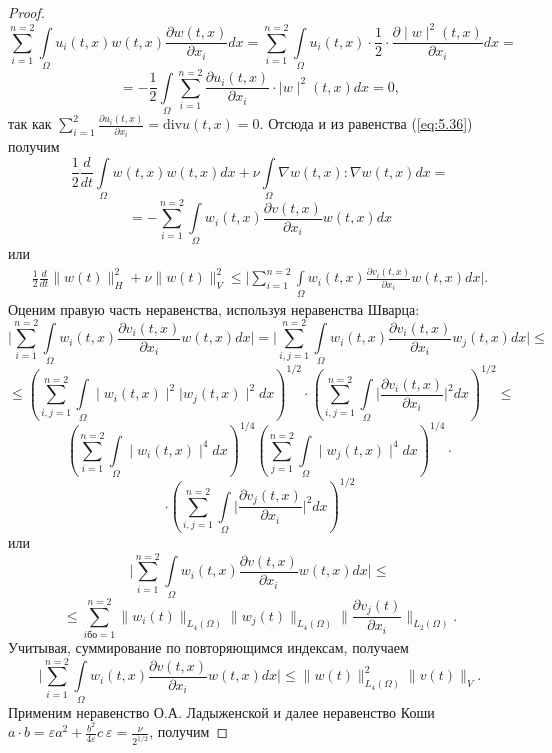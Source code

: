 \begin{proof}
    $$\sum_{i=1}^{n=2}\int\limits_\Omega u_i(t,x)w(t, x)\frac{\partial w(t, x)}{\partial x_i}dx=
    \sum_{i=1}^{n=2}\int\limits_\Omega u_i(t,x)\cdot\frac{1}{2}\cdot\frac{\partial \mid w\mid^2(t, x)}{\partial x_i}dx=$$
    $$=-\frac{1}{2}\int\limits_\Omega\sum_{i=1}^{n=2}\frac{\partial u_i(t, x)}{\partial x_i}\cdot\mid w\mid^2(t, x)dx=0,$$
    так как $\sum\limits_{i=1}^{2}\frac{\partial u_i(t, x)}{\partial x_i} = \textrm{div} u(t, x)=0.$
    Отсюда и из равенства (\ref{eq:5.36}) получим
    $$\frac{1}{2}\frac{d}{dt}\int\limits_\Omega w(t, x)w(t, x)dx+\nu\int\limits_{\Omega}\nabla w(t,x):\nabla w(t,x)dx=$$
    $$=-\sum_{i=1}^{n=2}\int\limits_\Omega w_i(t, x)\frac{\partial v(t, x)}{\partial x_i}w(t, x)dx$$
    или
    \begin{equation}\label{eq:5.37}
        \begin{gathered}
            \frac{1}{2}\frac{d}{dt}\| w(t)\|_H^2+\nu\| w(t)\|_V^2\le
            \bigg|\sum_{i=1}^{n=2}\int\limits_\Omega w_i(t, x)\frac{\partial v_i(t, x)}{\partial x_i}w(t, x)dx\bigg|.
        \end{gathered}
    \end{equation}
    Оценим правую часть неравенства, используя неравенства Шварца:
    $$\bigg|\sum_{i=1}^{n=2}\int\limits_\Omega w_i(t, x)\frac{\partial v_i(t, x)}{\partial x_i}w(t, x)dx\bigg|=
    \bigg|\sum_{i,j=1}^{n=2}\int\limits_\Omega w_i(t, x)\frac{\partial v_i(t, x)}{\partial x_i}w_j(t, x)dx\bigg|\le$$
    $$\le\left(\sum_{i,j=1}^{n=2}\int\limits_\Omega \mid w_i(t, x)\mid^2|w_j(t, x)\mid^2dx \right)^{1/2}
    \cdot\left(\sum_{i,j=1}^{n=2}\int\limits_\Omega\bigg|\frac{\partial v_i(t, x)}{\partial x_i}\bigg|^2dx \right)^{1/2}\le$$
    $$\left(\sum_{i=1}^{n=2}\int\limits_\Omega \mid w_i(t, x)\mid^4dx\right)^{1/4}\left(\sum_{j=1}^{n=2}\int\limits_\Omega \mid w_j(t, x)\mid^4dx\right)^{1/4}\cdot$$
    $$\cdot\left(\sum_{i,j=1}^{n=2}\int\limits_\Omega\bigg|\frac{\partial v_j(t, x)}{\partial x_i} \bigg|^2dx \right)^{1/2}$$
    или
    $$\bigg|\sum_{i=1}^{n=2}\int\limits_\Omega w_i(t, x)\frac{\partial v(t, x)}{\partial x_i}w(t, x)dx\bigg|\le$$
    $$\le\sum_{iбо=1}^{n=2}\| w_i(t)\|_{L_4(\Omega)}\| w_j(t)\|_{L_4(\Omega)}\|\frac{\partial v_j(t)}{\partial x_i}\|_{L_2(\Omega)}.$$
    Учитывая, суммирование по повторяющимся индексам, получаем
    $$\bigg|\sum_{i=1}^{n=2}\int\limits_\Omega w_i(t, x)\frac{\partial v(t, x)}{\partial x_i}w(t, x)dx\bigg|\le\| w(t)\|_{L_4(\Omega)}^2\| v(t)\|_V.$$
    Применим неравенство О.А. Ладыженской и далее неравенство Коши \linebreak
    $a\cdot b=\varepsilon a^2+\frac{b^2}{4\varepsilon}c \ \varepsilon=\frac{\nu}{2^{1/2}}$, получим

\end{proof}
